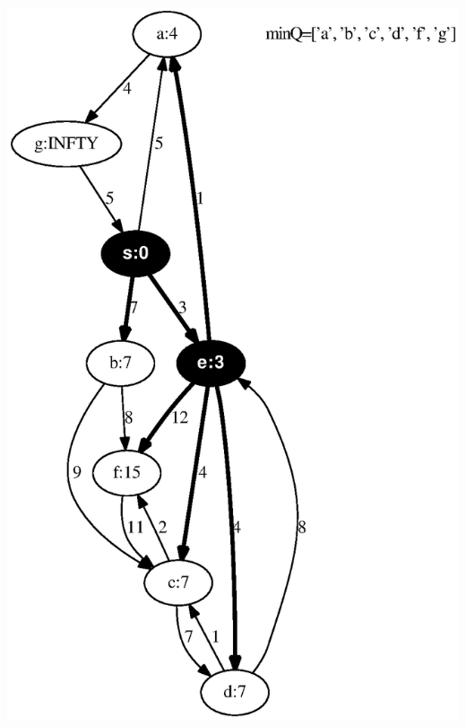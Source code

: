 \documentclass{article}
\begin{document}
\includegraphics[height=.3\textheight]{dijkstra_gross_yellen_02.eps}
\vspace{1em}
\end{document}
